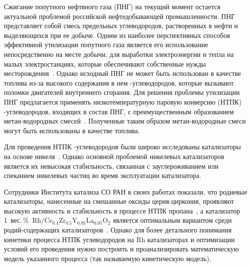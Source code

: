 \documentclass{cmi1}
\begin{document}
Сжигание попутного нефтяного газа (ПНГ) на текущий момент остается актуальной проблемой российской нефтедобывающей промышленности. 
ПНГ представляет собой смесь предельных углеводородов, растворенных в нефти и выделяющихся при ее добыче. 
Одним из наиболее перспективных способов эффективной утилизации попутного газа является его использование непосредственно на месте добычи, для выработки электроэнергии и тепла на малых электростанциях, которые обеспечивают собственные нужды месторождения~. Однако исходный ПНГ не может быть использован в качестве топлива из-за высокого содержания в нем -углеводородов, которые вызывают поломки двигателей внутреннего сгорания. Для решения проблемы утилизации ПНГ предлагается применять низкотемпературную паровую конверсию (НТПК) -углеводородов, входящих в состав ПНГ, с преимущественным образованием метан-водородных смесей~. Полученные таким образом метан-водородные смеси могут быть использованы в качестве топлива.

Для проведения НТПК -углеводородов были широко исследованы катализаторы на основе никеля~. Однако основной проблемой никелевых катализаторов является их невысокая стабильность, связанная с зауглероживанием или спеканием никелевых частиц во время эксплуатации катализатора.

Сотрудники Института катализа СО РАН в своих работах показали, что родиевые катализаторы, нанесенные на смешанные оксиды церия-циркония, проявляют высокую активность и стабильность в процессе НТПК пропана~, а катализатор 1~вес.\,\%~Rh/Ce$_{0.4}$Zr$_{0.5}$Y$_{0.05}$La$_{0.05}$O$_2$ является оптимальным вариантом среди родий-содержащих катализаторов~.
Однако для более детального понимания кинетики процесса НТПК углеводородов на Rh катализаторах и оптимизации условий его проведения нужно построить и проанализировать математическую модель указанного процесса (так называемую кинетическую модель).

\end{document}
